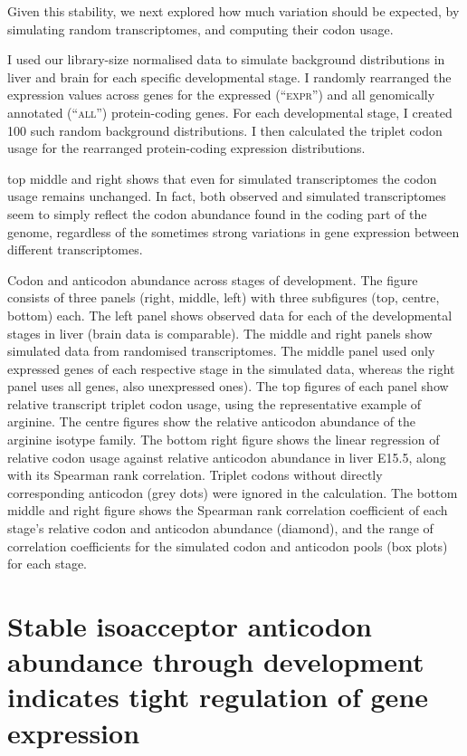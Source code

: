 Given this stability, we next explored how much variation should be expected, by
simulating random transcriptomes, and computing their codon usage.

I used our library-size normalised \rnaseq data to simulate background
distributions in liver and brain for each specific developmental stage. I
randomly rearranged the expression values across genes for the expressed
(“\textsc{expr}”) and all genomically annotated (“\textsc{all}”) protein-coding
genes. For each developmental stage, I created \num{100} such random background
distributions. I then calculated the triplet codon usage for the rearranged
protein-coding \rna expression distributions.

 top middle and right shows that even for
simulated transcriptomes the codon usage remains unchanged. In fact, both
observed and simulated transcriptomes seem to simply reflect the codon abundance
found in the coding part of the genome, regardless of the sometimes strong
variations in gene expression between different transcriptomes.

    {Codon and anticodon abundance across stages of development.}
    {The figure consists of three panels (right, middle, left) with three
    subfigures (top, centre, bottom) each. The left panel shows observed data
    for each of the developmental stages in liver (brain data is comparable).
    The middle and right panels show simulated data from randomised
    transcriptomes. The middle panel used only expressed genes of each
    respective stage in the simulated data, whereas the right panel uses all
    genes, also unexpressed ones). The top figures of each panel show relative
    \mrna transcript triplet codon usage, using the representative example of
    arginine. The centre figures show the relative \trna anticodon abundance of
    the arginine isotype family. The bottom right figure shows the linear
    regression of relative codon usage against relative anticodon abundance in
    liver E15.5, along with its Spearman rank correlation. Triplet codons
    without directly corresponding anticodon (grey dots) were ignored in the
    calculation. The bottom middle and right figure shows the Spearman rank
    correlation coefficient of each stage’s relative codon and anticodon
    abundance (diamond), and the range of correlation coefficients for the
    simulated codon and anticodon pools (box plots) for each stage.}

\section{Stable isoacceptor anticodon abundance through development indicates
tight regulation of  gene expression}

